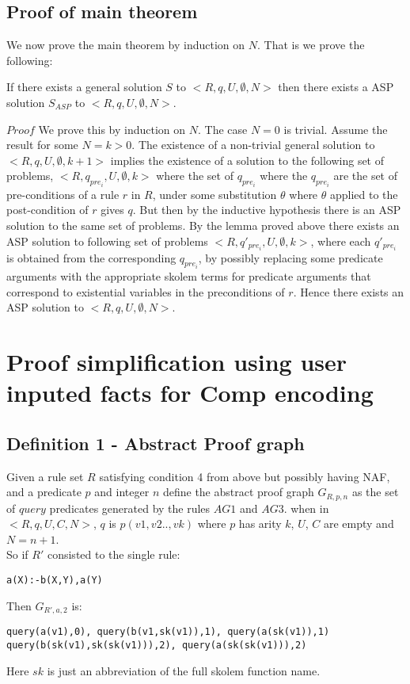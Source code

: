 \documentclass{article}
\begin{document}
\subsection{Proof of main theorem}
We now prove the main theorem by induction on $N$. That is we prove the following:\\
\begin{theorem}[Completeness]\label{completeness}If there exists a general solution $S$ to $<R,q,U,\emptyset,N>$ then there exists a ASP solution $S_{ASP}$ to $<R,q,U,\emptyset,N>$.
\end{theorem}
$Proof$ We prove this by induction on $N$. The case $N=0$ is trivial. Assume the result for some $N=k>0$. The existence of a non-trivial general solution to $<R,q,U,\emptyset,k+1>$ implies the existence of a solution to the following set of problems, $<R,q_{pre_{i}},U,\emptyset,k>$ where the set of $q_{pre_{i}}$ where the $q_{pre_{i}}$ are the set of pre-conditions of a rule $r$ in $R$, under some substitution $\theta$ where $\theta$ applied to the post-condition of $r$ gives $q$. But then by the inductive hypothesis there is an ASP solution to the same set of problems. By the lemma proved above there exists an ASP solution to following set of problems $<R,q'_{pre_{i}},U,\emptyset,k>$, where each $q'_{pre_{i}}$ is obtained from the corresponding $q_{pre_{i}}$, by possibly replacing some predicate arguments with the appropriate skolem terms for predicate arguments that correspond to existential variables in the preconditions of $r$. Hence there exists an ASP solution to $<R,q,U,\emptyset,N>$.

\section{Proof simplification using user inputed facts for Comp encoding}\label{sec:proof_simplification}
\subsection{Definition 1 - Abstract Proof graph}
Given a rule set $R$ satisfying condition 4 from above but possibly having NAF, and a predicate $p$ and integer $n$ define the abstract proof graph $G_{R,p,n}$ as the set of $query$ predicates generated by the rules $AG1$ and $AG3$. when in $<R,q,U,C,N>$, $q$ is $p(v1,v2..,vk)$ where $p$ has arity $k$, $U$, $C$ are empty and $N = n+1$. \\
\newline
So if $R'$ consisted to the single rule:
\begin{verbatim}
a(X):-b(X,Y),a(Y)
\end{verbatim}
Then $G_{R',a,2}$ is: \begin{verbatim}
query(a(v1),0), query(b(v1,sk(v1)),1), query(a(sk(v1)),1)
query(b(sk(v1),sk(sk(v1))),2), query(a(sk(sk(v1))),2) \end{verbatim}
Here $sk$ is just an abbreviation of the full skolem function name. 
\end{document}
